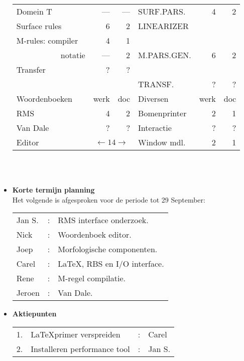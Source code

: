 \begin{itemize}
\begin{tabular}{||l||r|r||l||r|r||}
 Domein T          & ---&                ---&SURF.PARS.  &   4&  2   \\
 Surface rules     &   6&                  2&LINEARIZER  &    &      \\
 M-rules: compiler &   4&                  1&            &    &      \\
 ~~~~~~~~~~~notatie& ---&                  2&M.PARS.GEN. &   6&  2   \\
 Transfer          &   ?&                  ?&            &    &      \\ 
                   &    &                   &TRANSF.     &   ?&  ?   \\ \hline
 Woordenboeken     &werk&                doc&Diversen    &werk&doc   \\ \hline
 RMS               &   4&                  2&Bomenprinter&   2&  1   \\
 Van Dale          &   ?&                  ?&Interactie  &   ?&  ?   \\
 Editor            &\multicolumn{2}{c||}{$\leftarrow 14\rightarrow$}
                                            &Window mdl. &   2&  1   \\ \hline
 \end{tabular} \hspace{10mm}\\ \\
 \item {\bf Korte termijn planning}\\ 
 Het volgende is afgesproken voor de periode tot 29 September:\\
 \begin{tabular}{lcl}
  Jan S. &:&RMS interface onderzoek.          \\
  Nick   &:&Woordenboek editor.               \\
  Joep   &:&Morfologische componenten.        \\
  Carel  &:&\LaTeX, RBS en I/O interface.     \\
  Rene   &:&M-regel compilatie.               \\
  Jeroen &:&Van Dale.                         \\
 \end{tabular}
 \item {\bf Aktiepunten}\\
 \begin{tabular}{llcl}
  1.&\LaTeX primer verspreiden   &:&Carel \\
  2.&Installeren performance tool&:&Jan S.\\
 \end{tabular}
\end{itemize}
